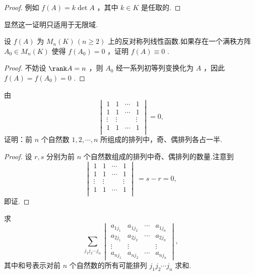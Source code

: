 \begin{proof}
	例如 $f(A)=k\det A$ ，其中 $k\in K$ 是任取的.
\end{proof}
\begin{note}
	显然这一证明只适用于无限域.
\end{note}
\begin{prob}[4]
	设 $f(A)$ 为 $M_n(K)\,(n\ge2)$ 上的反对称列线性函数.如果存在一个满秩方阵 $A_0\in M_n(K)$ 使得 $f(A_0)=0$ ，证明 $f(A)\equiv0$ .
\end{prob}
\begin{proof}
	不妨设 $\rank A=n$ ，则 $A_0$ 经一系列初等列变换化为 $A$ ，因此 $f(A)=f(A_0)=0$ .
\end{proof}
\begin{prob}[11]
	由
	\[
		\begin{vmatrix}
			1      & 1      & \cdots & 1      \\
			1      & 1      & \cdots & 1      \\
			\vdots & \vdots &        & \vdots \\
			1      & 1      & \cdots & 1      \\
		\end{vmatrix}=0,
	\]
	\hypertarget{Permutation}{证明}：前 $n$ 个自然数 $1,2,\cdots,n$ 所组成的排列中，奇、偶排列各占一半.
\end{prob}
\begin{proof}
	设 $r,s$ 分别为前 $n$ 个自然数组成的排列中奇、偶排列的数量.注意到
	\[
		\begin{vmatrix}
			1      & 1      & \cdots & 1      \\
			1      & 1      & \cdots & 1      \\
			\vdots & \vdots &        & \vdots \\
			1      & 1      & \cdots & 1      \\
		\end{vmatrix}\
		=s-r=0,
	\]
	即证.
\end{proof}
\begin{prob}[12]
	求
	\[
		\sum_{j_1j_2\cdots j_n}
		\begin{vmatrix}
			a_{1j_1} & a_{1j_2} & \cdots & a_{1j_n} \\
			a_{2j_1} & a_{2j_2} & \cdots & a_{2j_n} \\
			\vdots   & \vdots   &        & \vdots   \\
			a_{nj_1} & a_{nj_2} & \cdots & a_{nj_n}
		\end{vmatrix},
	\]
	其中和号表示对前 $n$ 个自然数的所有可能排列 $j_1j_2\cdots j_n$ 求和.
\end{prob}
